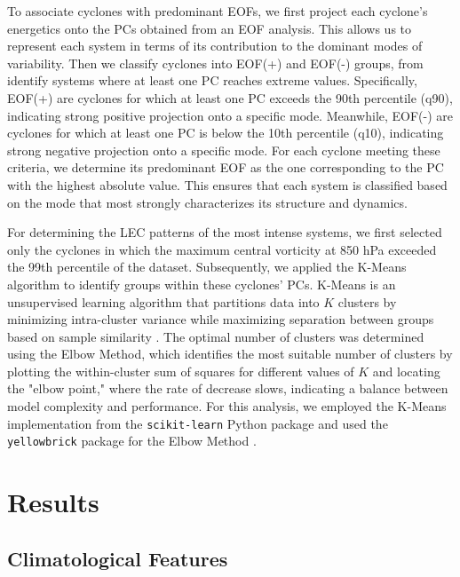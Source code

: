 \documentclass[pdflatex,sn-chicago]{sn-jnl}%
\theoremstyle{plain}
\theoremstyle{definition}
\theoremstyle{remark}
\theoremstyle{definition}
\begin{document}
To associate cyclones with predominant EOFs, we first project each cyclone's energetics onto the PCs obtained from an EOF analysis. This allows us to represent each system in terms of its contribution to the dominant modes of variability. Then we classify cyclones into EOF(+) and EOF(-) groups, from identify systems where at least one PC reaches extreme values. Specifically, EOF(+) are cyclones for which at least one PC exceeds the 90th percentile (q90), indicating strong positive projection onto a specific mode. Meanwhile, EOF(-) are  cyclones for which at least one PC is below the 10th percentile (q10), indicating strong negative projection onto a specific mode. For each cyclone meeting these criteria, we determine its predominant EOF as the one corresponding to the PC with the highest absolute value. This ensures that each system is classified based on the mode that most strongly characterizes its structure and dynamics.

For determining the LEC patterns of the most intense systems, we first selected only the cyclones in which the maximum central vorticity at 850 hPa exceeded the 99th percentile of the dataset. Subsequently, we applied the K-Means algorithm to identify groups within these cyclones' PCs. K-Means is an unsupervised learning algorithm that partitions data into \( K \) clusters by minimizing intra-cluster variance while maximizing separation between groups based on sample similarity \citep{macqueen1967,hartiganwong1979}. The optimal number of clusters was determined using the Elbow Method, which identifies the most suitable number of clusters by plotting the within-cluster sum of squares for different values of \( K \) and locating the "elbow point," where the rate of decrease slows, indicating a balance between model complexity and performance. For this analysis, we employed the K-Means implementation from the \texttt{scikit-learn} Python package \citep{hao2019machine} and used the \texttt{yellowbrick} package for the Elbow Method \citep{bengfort2019yellowbrick}.




\section{Results}\label{sec:results}

\subsection{Climatological Features}\label{sec:climatology}
\end{document}
